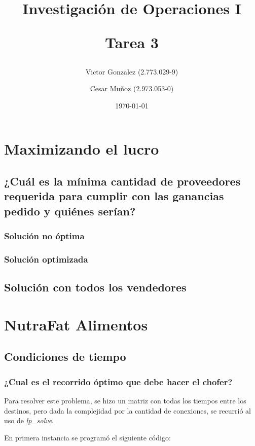 \documentclass[12pt,letterpaper]{article}
\begin{document}
\title{Investigación de Operaciones I \\ \begin{Large}Tarea 3\end{Large}} 
\author{Victor Gonzalez (2.773.029-9)
\and Cesar Muñoz (2.973.053-0)}
\date{\today}
\maketitle


\section{Maximizando el lucro}
\subsection{¿Cuál es la mínima cantidad de proveedores requerida para cumplir con las ganancias pedido y quiénes serían?}
\subsubsection{Solución no óptima}
\subsubsection{Solución optimizada}

\subsection{Solución con todos los vendedores}
%


\section{NutraFat Alimentos}
\subsection{Condiciones de tiempo}
\subsubsection{¿Cual es el recorrido óptimo que debe hacer el chofer?}
Para resolver este problema, se hizo un matriz con todas los tiempos entre los destinos, pero dada la complejidad por la cantidad de conexiones, se recurrió al uso de \textit{lp\_solve}.

En primera instancia se programó el siguiente código:
\end{document}
